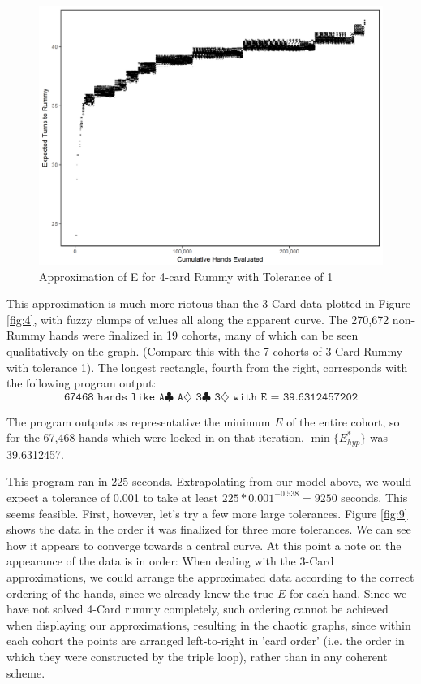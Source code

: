 \documentclass[letter,12pt]{article}
\begin{document}
\begin{figure}
\includegraphics[width=\textwidth]{fig8.png}
\caption{Approximation of E for 4-card Rummy with Tolerance of 1}\label{fig:8}
\end{figure}


This approximation is much more riotous than the 3-Card data plotted in Figure \ref{fig:4}, with fuzzy clumps of values all along the apparent curve. The 270,672 non-Rummy hands were finalized in 19 cohorts, many of which can be seen qualitatively on the graph. (Compare this with the 7 cohorts of 3-Card Rummy with tolerance 1). The longest rectangle, fourth from the right, corresponds with the following program output:
$$\texttt{67468 hands like A$\clubsuit$ A$\diamondsuit$ 3$\clubsuit$ 3$\diamondsuit$ with E = 39.6312457202}$$

The program outputs as representative the minimum $E$ of the entire cohort, so for the 67,468 hands which were locked in on that iteration, $\min\{E_{hyp}^*\}$ was 39.6312457. 

This program ran in 225 seconds. Extrapolating from our model above, we would expect a tolerance of 0.001 to take at least $225 * 0.001^{-0.538} = 9250$ seconds. This seems feasible. First, however, let's try a few more large tolerances. Figure \ref{fig:9} shows the data in the order it was finalized for three more tolerances. We can see how it appears to converge towards a central curve. At this point a note on the appearance of the data is in order: When dealing with the 3-Card approximations, we could arrange the approximated data according to the correct ordering of the hands, since we already knew the true $E$ for each hand. Since we have not solved 4-Card rummy completely, such ordering cannot be achieved when displaying our approximations, resulting in the chaotic graphs, since within each cohort the points are arranged left-to-right in 'card order' (i.e. the order in which they were constructed by the triple loop), rather than in any coherent scheme.
\end{document}
